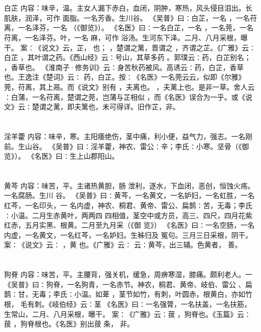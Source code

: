 \documentclass[12pt,UTF8]{ctexbook}
\begin{document}
\chapter{}白芷
内容：味辛，温。主女人漏下赤白，血闭，阴肿，寒热，风头侵目泪出。长肌肤，润泽，可作 
面脂。一名芳香。生川谷。 
《吴普》曰∶白芷，一名 ，一名苻离，一名泽芬，一名 （《御览》）。 
《名医》曰∶一名白芷，一名 ，一名莞，一名苻离，一名泽芬。叶，一名 麻，可作 
浴汤。生河东下泽。二月、八月采根，曝干。 
案∶《说文》云，芷， 也； ，楚谓之篱，晋谓之 ，齐谓之芷。《广雅》云∶白芷 
，其叶谓之药。《西山经》云∶号山，其草多药 。郭璞云∶药，白芷别名； ，香草也。 
《淮南子·修务训》云∶身苦秋药被风。高诱云∶药，白芷，香草也。王逸注《楚词》云∶ 
药，白芷。按∶《名医》一名莞云云，似即《尔雅》莞，苻离，其上鬲。而《说文》别有 
，夫离也。 ，夫蓠上也。是非一草。舍人云∶白蒲，一名苻离，楚谓之莞，岂蒲与芷相似 
，而《名医》误合为一乎。或《说文》云∶楚谓之蓠，即夫篱也，未可得详。旧作芷，非。 


\chapter{}淫羊藿
内容：味辛，寒。主阳痿绝伤，茎中痛，利小便，益气力，强志。一名刚前。生山谷。 
《吴普》曰∶淫羊藿，神农、雷公∶辛；李氏∶小寒。坚骨（《御览》）。 
《名医》曰∶生上山郡阳山。 


\chapter{}黄芩
内容：味苦，平。主诸热黄胆，肠 泄利，逐水，下血闭，恶创，恒蚀火疡。一名腐肠。生川 
谷。 
《吴普》曰∶黄芩，一名黄文，一名妒妇，一名虹胜，一名红芩，一名印头，一 
名内虚，神农、桐君、黄帝、雷公、扁鹊∶苦，无毒；李氏∶小温。二月生赤黄叶，两两四 
四相值，茎空中或方员，高三、四尺，四月花紫红赤，五月实黑、根黄。二月至九月采（《御 
览》） 
《名医》曰∶一名空肠，一名内虚，一名黄文，一名红芩，一名妒妇。生秭归及 
冤句。三月三日采根，阴干。 
案∶《说文》云∶ ，黄 也。《广雅》云∶ 
云∶黄芩，出三辅。色黄者， 
善。 


\chapter{}狗脊
内容：味苦，平。主腰背，强关机，缓急，周痹寒湿，膝痛。颇利老人。一 
《吴普》曰∶狗脊，一名狗青，一名赤节。神农，桐君、黄帝、岐伯、雷公 
、扁鹊∶甘，无毒；李氏∶小温。如萆 ，茎节如竹，有刺，叶圆赤，根黄白，亦如竹根， 
毛有刺。《岐伯经》云∶茎 
《名医》曰∶一名强膂，一名扶盖，一名扶筋，生常山，二月、八月采根，曝干。 
案∶《广雅》云∶菝 ，狗脊也。《玉篇》云∶菝 ，狗脊根也。《名医》别出菝 条， 
非。 
\end{document}
